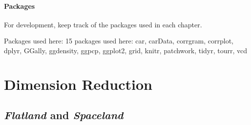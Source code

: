 \documentclass[
  letterpaper,
  10pt,
  krantz2]{krantz}
\begin{document}
\subsubsection*{Packages}\label{packages}

For development, keep track of the packages used in each chapter.

Packages used here: 15 packages used here: car, carData, corrgram,
corrplot, dplyr, GGally, ggdensity, ggpcp, ggplot2, grid, knitr,
patchwork, tidyr, tourr, vcd


\chapter{Dimension Reduction}\label{sec-pca-biplot}

\renewcommand*{\vec}[1]{\mathbf{#1}}
\newcommand{\trans}{^\mathsf{T}}
\newcommand*{\mat}[1]{\mathbf{#1}}
\newcommand*{\diag}[1]{\mathrm{diag}\, #1}

\renewcommand*{\det}[1]{\mathrm{det}(#1)}
\newcommand*{\rank}[1]{\mathrm{rank} (\mathbf{#1})}
\newcommand*{\trace}[1]{\mathrm{tr} (\mathbf{#1})}
\newcommand*{\dev}[1]{(#1 - \bar{#1})}
\newcommand*{\inv}[1]{\mat{#1}^{-1}}
\newcommand*{\half}[1]{\mat{#1}^{1/2}}
\newcommand*{\invhalf}[1]{\mat{#1}^{-1/2}}
\newcommand*{\nvec}[2]{{#1}_{1}, {#1}_{2},\ldots,{#1}_{#2}}
\newcommand*{\Beta}{\boldsymbol{B}}
\newcommand*{\Epsilon}{\boldsymbol{\Large\varepsilon}}
\newcommand*{\period}{\:\: .}
\newcommand*{\comma}{\:\: ,}
\newcommand*{\given}{\, | \,}
\newcommand*{\Real}[1]{\mathbb{R}^{#1}}
\newcommand*{\degree}[1]{{#1}^{\circ}}

\newcommand{\sizedmat}[2]{\mathord{\mathop{\mat{#1}}\limits_{#2}}}

\renewcommand*{\H}{\mathbf{H}}               
\newcommand*{\E}{\mathbf{E}}
\newcommand*{\widebar}[1]{\overline{#1}}

\newcommand{\Var}{\mathsf{Var}}
\newcommand{\Cov}{\mathsf{Cov}}
\newcommand{\HO}{\mathcal{H}_0}

\newcommand*{\V}{\mathcal{V}}

\newcommand{\pkg}[1]{\textsf{#1}}
\newcommand{\Rpackage}[1]{\pkg{#1} package}

\section{\texorpdfstring{\emph{Flatland} and
\emph{Spaceland}}{Flatland and Spaceland}}\label{sec-spaceland}
\end{document}

